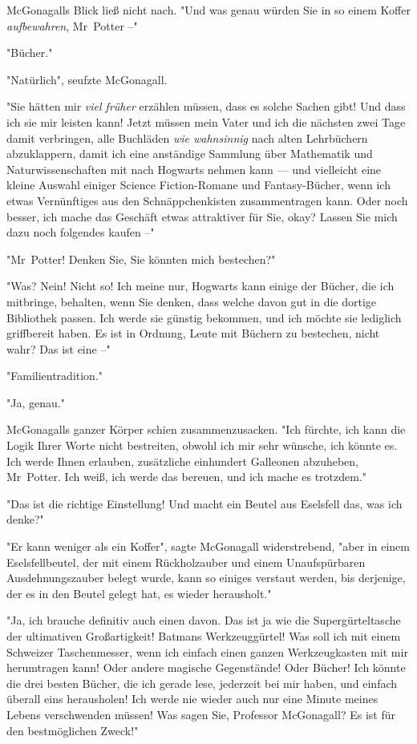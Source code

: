 {McGonagalls Blick ließ nicht nach. "Und was genau würden Sie in so einem Koffer \emph{aufbewahren}, Mr~Potter --"

"Bücher."

"Natürlich", seufzte McGonagall.

"Sie hätten mir \emph{viel früher} erzählen müssen, dass es solche Sachen gibt! Und dass ich sie mir leisten kann! Jetzt müssen mein Vater und ich die nächsten zwei Tage damit verbringen, alle Buchläden \emph{wie wahnsinnig} nach alten Lehrbüchern abzuklappern, damit ich eine anständige Sammlung über Mathematik und Naturwissenschaften mit nach Hogwarts nehmen kann --- und vielleicht eine kleine Auswahl einiger Science Fiction-Romane und Fantasy-Bücher, wenn ich etwas Vernünftiges aus den Schnäppchenkisten zusammentragen kann. Oder noch besser, ich mache das Geschäft etwas attraktiver für Sie, okay? Lassen Sie mich dazu noch folgendes kaufen --"

"Mr~Potter! Denken Sie, Sie könnten mich bestechen?"

"Was? Nein! Nicht so! Ich meine nur, Hogwarts kann einige der Bücher, die ich mitbringe, behalten, wenn Sie denken, dass welche davon gut in die dortige Bibliothek passen. Ich werde sie günstig bekommen, und ich möchte sie lediglich griffbereit haben. Es ist in Ordnung, Leute mit Büchern zu bestechen, nicht wahr? Das ist eine --"

"Familientradition."

"Ja, genau."

McGonagalls ganzer Körper schien zusammenzusacken. "Ich fürchte, ich kann die Logik Ihrer Worte nicht bestreiten, obwohl ich mir sehr wünsche, ich könnte es. Ich werde Ihnen erlauben, zusätzliche einhundert Galleonen abzuheben, Mr~Potter. Ich weiß, ich werde das bereuen, und ich mache es trotzdem."

"Das ist die richtige Einstellung! Und macht ein Beutel aus Eselsfell das, was ich denke?"

"Er kann weniger als ein Koffer", sagte McGonagall widerstrebend, "aber in einem Eselsfellbeutel, der mit einem Rückholzauber und einem Unaufspürbaren Ausdehnungszauber belegt wurde, kann so einiges verstaut werden, bis derjenige, der es in den Beutel gelegt hat, es wieder herausholt."

"Ja, ich brauche definitiv auch einen davon. Das ist ja wie die Supergürteltasche der ultimativen Großartigkeit! Batmans Werkzeuggürtel! Was soll ich mit einem Schweizer Taschenmesser, wenn ich einfach einen ganzen Werkzeugkasten mit mir herumtragen kann! Oder andere magische Gegenstände! Oder Bücher! Ich könnte die drei besten Bücher, die ich gerade lese, jederzeit bei mir haben, und einfach überall eins herausholen! Ich werde nie wieder auch nur eine Minute meines Lebens verschwenden müssen! Was sagen Sie, Professor McGonagall? Es ist für den bestmöglichen Zweck!"

}
